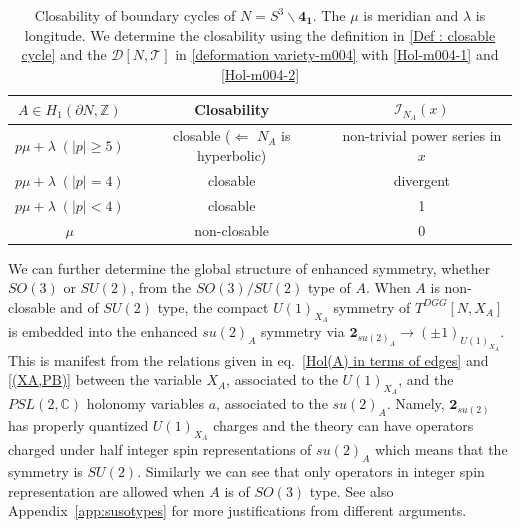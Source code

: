 \documentclass[a4paper,11pt]{article}
\def\cT{\mathcal{T}}
\def\cD{\mathcal{D}}
\def\cI{\mathcal{I}}
\begin{document}
\begin{table}[h!]
\centering
\begin{tabular}{|c || c || c |}
\hline
$A \in H_1 (\partial N, \mathbb{Z})$  & \textrm{Closability } & $\cI_{N_{A}}(x)$\\
\hline
\hline
$p\mu + \lambda \; ( |p| \geq 5)$& closable ($\Leftarrow$ $N_A$ is hyperbolic)  & non-trivial power series in $x$ \\\hline
$p\mu + \lambda \; ( |p| = 4)$   & closable  &  divergent  \\
\hline
$p\mu + \lambda \; ( |p|< 4)$ & closable & 1 \\
\hline
$\mu$ & non-closable & 0 \\
\hline
\end{tabular}
\caption{Closability of boundary cycles of $N=S^3\backslash \mathbf{4_1}$. The $\mu$ is meridian and $\lambda$ is longitude. 
We determine the closability using the definition in \eqref{Def : closable cycle} and the $\cD[N,\cT]$ in \eqref{deformation variety-m004} with \eqref{Hol-m004-1} and \eqref{Hol-m004-2}} \label{Boundary cycles of 4-1}
\end{table}
%

We can further determine the global structure of enhanced symmetry, whether $SO(3)$ or $SU(2)$, from the $SO(3)/SU(2)$ type of $A$. 
When $A$ is non-closable and  of $SU(2)$ type, the compact $U(1)_{X_A}$ symmetry  of $T^{DGG}[N,X_A]$ is embedded into the enhanced $su(2)_A$ symmetry via $\mathbf{2}_{su(2)_A}\rightarrow (\pm 1)_{U(1)_{X_A}}$. This is manifest from  the relations given in eq.~\eqref{Hol(A) in terms of edges} and \eqref{(XA,PB)}  between the variable $X_A$, associated to the $U(1)_{X_A}$, and  the $PSL(2,\mathbb{C})$ holonomy variables $a$, associated to the $su(2)_A$. 
Namely, $\mathbf{2}_{su(2)}$ has properly quantized $U(1)_{X_A}$ charges and the theory can have operators charged under half integer spin representations of $su(2)_A$ which means that the symmetry is $SU(2)$. Similarly we can see that only operators in integer spin representation are allowed when $A$ is of $SO(3)$ type.
See also Appendix~\ref{app:susotypes} for more justifications from different arguments. 
\end{document}

